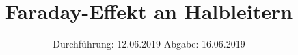 

\subject{V46}
\title{Faraday-Effekt an Halbleitern}
\date{%
  Durchführung: 12.06.2019
  \hspace{3em}
  Abgabe: 16.06.2019
}



\maketitle
\thispagestyle{empty}
\tableofcontents
\newpage






\printbibliography{}


